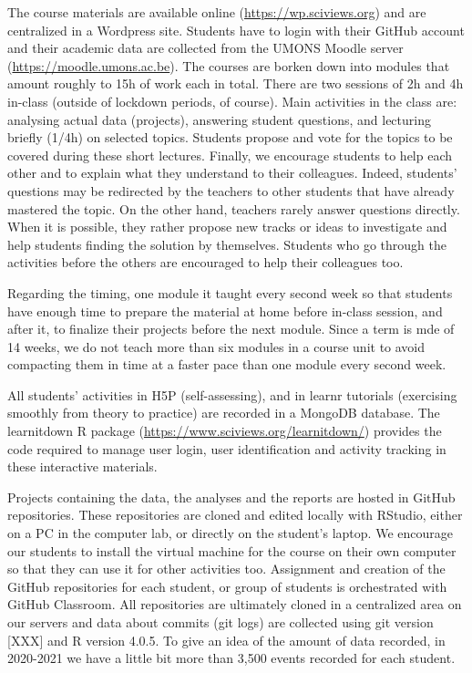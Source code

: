 \documentclass[
]{article}
\begin{document}
The course materials are available online
(\url{https://wp.sciviews.org}) and are centralized in a Wordpress site.
Students have to login with their GitHub account and their academic data
are collected from the UMONS Moodle server
(\url{https://moodle.umons.ac.be}). The courses are borken down into
modules that amount roughly to 15h of work each in total. There are two
sessions of 2h and 4h in-class (outside of lockdown periods, of course).
Main activities in the class are: analysing actual data (projects),
answering student questions, and lecturing briefly (1/4h) on selected
topics. Students propose and vote for the topics to be covered during
these short lectures. Finally, we encourage students to help each other
and to explain what they understand to their colleagues. Indeed,
students' questions may be redirected by the teachers to other students
that have already mastered the topic. On the other hand, teachers rarely
answer questions directly. When it is possible, they rather propose new
tracks or ideas to investigate and help students finding the solution by
themselves. Students who go through the activities before the others are
encouraged to help their colleagues too.

Regarding the timing, one module it taught every second week so that
students have enough time to prepare the material at home before
in-class session, and after it, to finalize their projects before the
next module. Since a term is mde of 14 weeks, we do not teach more than
six modules in a course unit to avoid compacting them in time at a
faster pace than one module every second week.

All students' activities in H5P (self-assessing), and in learnr
tutorials (exercising smoothly from theory to practice) are recorded in
a MongoDB database. The learnitdown R package
(\url{https://www.sciviews.org/learnitdown/}) provides the code required
to manage user login, user identification and activity tracking in these
interactive materials.

Projects containing the data, the analyses and the reports are hosted in
GitHub repositories. These repositories are cloned and edited locally
with RStudio, either on a PC in the computer lab, or directly on the
student's laptop. We encourage our students to install the virtual
machine for the course on their own computer so that they can use it for
other activities too. Assignment and creation of the GitHub repositories
for each student, or group of students is orchestrated with GitHub
Classroom. All repositories are ultimately cloned in a centralized area
on our servers and data about commits (git logs) are collected using git
version {[}XXX{]} and R version 4.0.5. To give an idea of the amount of
data recorded, in 2020-2021 we have a little bit more than 3,500 events
recorded for each student.
\end{document}
